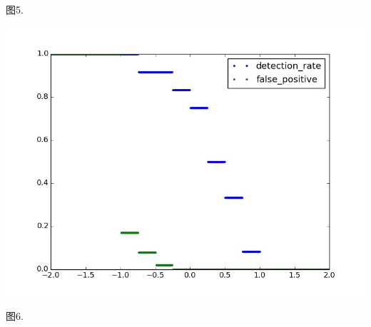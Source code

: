 \documentclass{ctexart}
\begin{document}
\begin{center}
图5. 

\includegraphics[height=10cm]{./graphics/RandomForestRegressor_8E.jpg}

图6.

\end{center}
\end{document}
